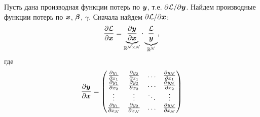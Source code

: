 \documentclass{report}
\numberwithin{theorem}{chapter}
\numberwithin{statement}{chapter}
\numberwithin{lemma}{chapter}
\theoremstyle{definition}
\numberwithin{task}{chapter}
\theoremstyle{remark}
\numberwithin{example}{chapter}
\theoremstyle{definition}
\numberwithin{definition}{chapter}
\theoremstyle{remark}
\theoremstyle{remark}
\numberwithin{lyrics}{section}
\begin{document}
Пусть дана производная функции потерь по $\boldsymbol{y}$, т.е. $\partial \mathcal{L} / \partial \boldsymbol{y}$. Найдем производные функции потерь по $\boldsymbol{x}$, $\boldsymbol{\beta}$, $\gamma$.
Сначала найдем $\partial \mathcal{L} / \partial \boldsymbol{x}$:
\begin{gather}
\frac{\partial \mathcal{L} }{\partial \boldsymbol{x}} = \underbrace{\frac{\partial \boldsymbol{y} }{\partial \boldsymbol{x}}}_{\mathbb{R}^{\mathcal{N} \times \mathcal{N}}} \cdot \underbrace{\frac{\mathcal{L}}{\boldsymbol{y}}}_{\mathbb{R}^{\mathcal{N}}},
\end{gather}
где 
\begin{equation}
\frac{\partial \boldsymbol{y} }{\partial \boldsymbol{x}} = 
\begin{pmatrix}
\frac{\partial y_1 }{\partial x_1} &\frac{\partial y_2 }{\partial x_1} &\dots &\frac{\partial y_{\mathcal{N}} }{\partial x_1} \\
\frac{\partial y_1 }{\partial x_2} &\frac{\partial y_2 }{\partial x_2} &\dots &\frac{\partial y_{\mathcal{N}} }{\partial x_2} \\
\vdots 			   &\vdots 			   &\ddots &\vdots                        \\
\frac{\partial y_1 }{\partial x_{\mathcal{N}}} &\frac{\partial y_2 }{\partial x_{\mathcal{N}}} &\dots &\frac{\partial y_{\mathcal{N}} }{\partial x_{\mathcal{N}}} \\
\end{pmatrix}
\end{equation}
\end{document}
